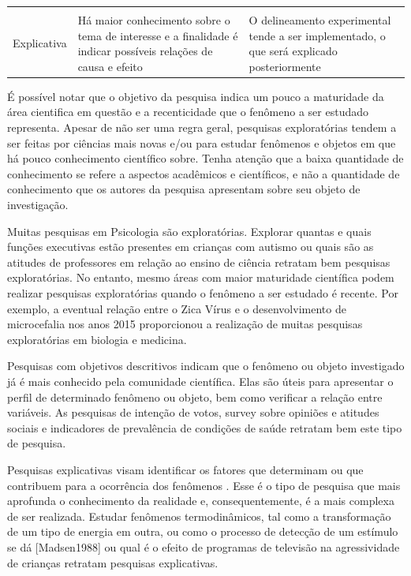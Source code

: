 \documentclass[
]{book}
\begin{document}
\begin{longtable}[]{@{}lll@{}}
\begin{minipage}[t]{0.30\columnwidth}
\end{minipage}\tabularnewline
\begin{minipage}[t]{0.30\columnwidth}\raggedright
Explicativa\strut
\end{minipage} & \begin{minipage}[t]{0.30\columnwidth}\raggedright
Há maior conhecimento sobre o tema de interesse e a finalidade é indicar possíveis relações de causa e efeito\strut
\end{minipage} & \begin{minipage}[t]{0.30\columnwidth}\raggedright
O delineamento experimental tende a ser implementado, o que será explicado posteriormente\strut
\end{minipage}\tabularnewline
\bottomrule
\end{longtable}

É possível notar que o objetivo da pesquisa indica um pouco a maturidade da área cientifica em questão e a recenticidade que o fenômeno a ser estudado representa. Apesar de não ser uma regra geral, pesquisas exploratórias tendem a ser feitas por ciências mais novas e/ou para estudar fenômenos e objetos em que há pouco conhecimento científico sobre. Tenha atenção que a baixa quantidade de conhecimento se refere a aspectos acadêmicos e científicos, e não a quantidade de conhecimento que os autores da pesquisa apresentam sobre seu objeto de investigação.

Muitas pesquisas em Psicologia são exploratórias. Explorar quantas e quais funções executivas estão presentes em crianças com autismo \citep{Skogli2020} ou quais são as atitudes de professores em relação ao ensino de ciência \citep{Jones1994} retratam bem pesquisas exploratórias. No entanto, mesmo áreas com maior maturidade científica podem realizar pesquisas exploratórias quando o fenômeno a ser estudado é recente. Por exemplo, a eventual relação entre o Zica Vírus e o desenvolvimento de microcefalia nos anos 2015 proporcionou a realização de muitas pesquisas exploratórias em biologia e medicina.

Pesquisas com objetivos descritivos indicam que o fenômeno ou objeto investigado já é mais conhecido pela comunidade científica. Elas são úteis para apresentar o perfil de determinado fenômeno ou objeto, bem como verificar a relação entre variáveis. As pesquisas de intenção de votos, survey sobre opiniões e atitudes sociais e indicadores de prevalência de condições de saúde retratam bem este tipo de pesquisa.

Pesquisas explicativas visam identificar os fatores que determinam ou que contribuem para a ocorrência dos fenômenos \citep{gil2002}. Esse é o tipo de pesquisa que mais aprofunda o conhecimento da realidade e, consequentemente, é a mais complexa de ser realizada. Estudar fenômenos termodinâmicos, tal como a transformação de um tipo de energia em outra, ou como o processo de detecção de um estímulo se dá {[}Madsen1988{]} ou qual é o efeito de programas de televisão na agressividade de crianças \citeyearpar{Bandura1961} retratam pesquisas explicativas.
\end{document}
